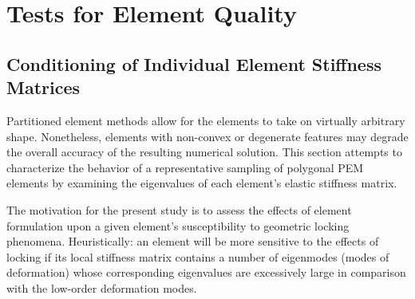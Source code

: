
\section{Tests for Element Quality}

\subsection*{Conditioning of Individual Element Stiffness Matrices}

Partitioned element methods allow for the elements to take on virtually arbitrary shape. Nonetheless, elements with non-convex or degenerate features may degrade the overall accuracy of the resulting numerical solution. This section attempts to characterize the behavior of a representative sampling of polygonal PEM elements by examining the eigenvalues of each element's elastic stiffness matrix.

The motivation for the present study is to assess the effects of element formulation upon a given element's susceptibility to geometric locking phenomena. Heuristically: an element will be more sensitive to the effects of locking if its local stiffness matrix contains a number of eigenmodes (modes of deformation) whose corresponding eigenvalues are excessively large in comparison with the low-order deformation modes.

